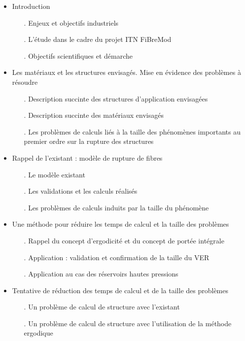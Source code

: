 \begin{itemize}
\item Introduction
\begin{itemize}
           \item[.] Enjeux et objectifs industriels
           \item[.] L'étude dans le cadre du projet ITN FiBreMod
           \item[.] Objectifs scientifiques et démarche
\end{itemize}

\cite{abbas_hybrid_2018}

\item Les matériaux et les structures envisagés. Mise en évidence des problèmes à résoudre
\begin{itemize}
    \item[.]  Description succinte des structures d'application envisagées
    \item[.]  Description succinte des matériaux envisagés
    \item[.]  Les problèmes de calculs liés à la taille des phénomènes importants au premier ordre sur la rupture des structures
\end{itemize}

\item Rappel de l'existant : modèle de rupture de fibres
\begin{itemize}
    \item[.]  Le modèle existant
    \item[.]  Les validations et les calculs réalisés
    \item[.]  Les problèmes de calculs induits par la taille du phénomène
\end{itemize}

\item Une méthode pour réduire les temps de calcul et la taille des problèmes
\begin{itemize}
           \item[.] Rappel du concept d'ergodicité et du concept de portée intégrale
           \item[.] Application : validation et confirmation de la taille du VER
           \item[.] Application au cas des réservoirs hautes pressions
\end{itemize}

\item Tentative de réduction des temps de calcul et de la taille des problèmes
\begin{itemize}
    \item[.] Un problème de calcul de structure avec l'existant
    \item[.] Un problème de calcul de structure avec l'utilisation de la méthode ergodique
\end{itemize}


\end{itemize}
